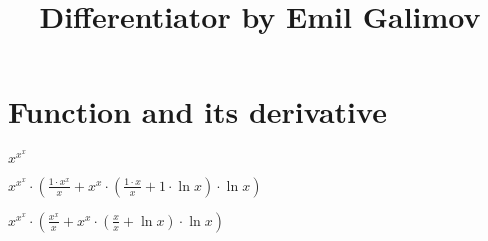 \documentclass{article}
\title{Differentiator by Emil Galimov}
\begin{document}
\maketitle
\section{Function and its derivative}
\begin{center}
$x^{x^{x}}$\\
\end{center}
\begin{center}
$x^{x^{x}} \cdot (\frac{1 \cdot x^{x}}{x}+x^{x} \cdot (\frac{1 \cdot x}{x}+1 \cdot  \ln{x}) \cdot  \ln{x})$\\
\end{center}
\begin{center}
$x^{x^{x}} \cdot (\frac{x^{x}}{x}+x^{x} \cdot (\frac{x}{x}+ \ln{x}) \cdot  \ln{x})$\\
\end{center}
\end{document}
